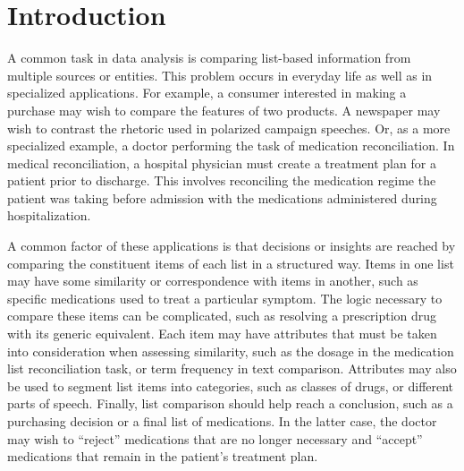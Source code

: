 \documentclass{chi2009}
\begin{document}


\section{Introduction}
A common task in data analysis is comparing list-based information from multiple sources or entities. This problem occurs in everyday life as well as in specialized applications. For example, a consumer interested in making a purchase may wish to compare the features of two products. A newspaper may wish to contrast the rhetoric used in polarized campaign speeches. Or, as a more specialized example, a doctor performing the task of medication reconciliation. In medical reconciliation, a hospital physician must create a treatment plan for a patient prior to discharge. This involves reconciling the medication regime the patient was taking before admission with the medications administered during hospitalization. 

A common factor of these applications is that decisions or insights are reached by comparing the constituent items of each list in a structured way. Items in one list may have some similarity or correspondence with items in another, such as specific medications used to treat a particular symptom. The logic necessary to compare these items can be complicated, such as resolving a prescription drug with its generic equivalent. Each item may have attributes that must be taken into consideration when assessing similarity, such as the dosage in the medication list reconciliation task, or term frequency in text comparison. Attributes may also be used to segment list items into categories, such as classes of drugs, or different parts of speech. Finally, list comparison should help reach a conclusion, such as a purchasing decision or a final list of medications. In the latter case, the doctor may wish to ``reject'' medications that are no longer necessary and ``accept'' medications that remain in the patient's treatment plan.
\end{document}
